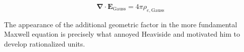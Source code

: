 \documentclass[notoc]{tufte-handout}
\renewcommand{\vec}[1]{\mathbf{#1}}
\newcommand{\del}{\vec{\nabla}}
\begin{document}
\begin{equation}
\del \cdot \vec{E}_{\text{Gauss}} = 4\pi \rho_{e, \text{Gauss}}
\end{equation}

The appearance of the additional geometric factor in the more fundamental Maxwell equation is precisely what annoyed Heaviside and motivated him to develop rationalized units.












\end{document}
